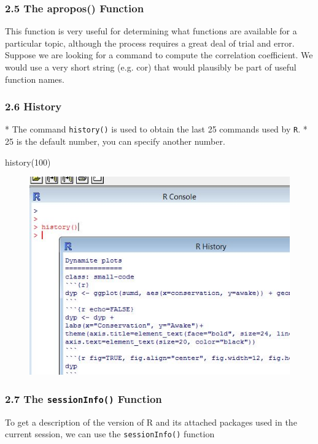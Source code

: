  
 
 \frametitle{2.5 The apropos() Function}
 This function is very useful for determining what functions are available for a particular topic,
 although the process requires a great deal of trial and error. Suppose we are looking for a
 command to compute the correlation coefficient. We would use a very short string (e.g. cor)
 that would plausibly be part of useful function names.
 
 
 
 \frametitle{2.6 History}
 
*  The command \texttt{history()} is used to obtain the last 25 commands used by \texttt{R}.
*  25 is the default number, you can specify another number.

 \begin{framed}
 \begin{semiverbatim}
 history(100)
 \end{semiverbatim}
 \end{framed}
 
 
 
 \begin{figure}
 \centering
 \includegraphics[width=0.7\linewidth]{images/Rhistory}        
 \end{figure}
    
 
 \frametitle{2.7 The \texttt{sessionInfo()} Function}
 To get a description of the version of R and its attached packages used in the current session,
 we can use the \texttt{sessionInfo()} function
 
